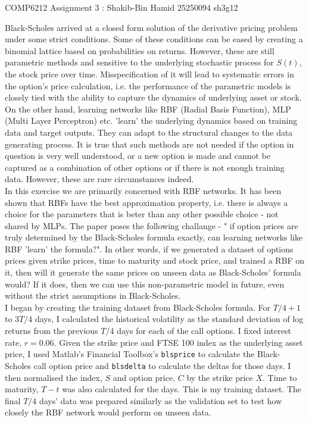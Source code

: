 \documentclass[11pt, fleqn]{article}
\begin{document}
\begin{center}

\Large{COMP6212 Assignment 3 : Shakib-Bin Hamid 25250094 sh3g12}

\end{center}

Black-Scholes arrived at a closed form solution of the derivative pricing problem under some strict conditions. Some of these conditions can be eased by creating a binomial lattice based on probabilities on returns. However, these are still parametric methods and sensitive to the underlying stochastic process for $S(t)$, the stock price over time. Misspecification of it will lead to systematic errors in the option's price calculation, i.e. the performance of the parametric models is closely tied with the ability to capture the dynamics of underlying asset or stock.\\

On the other hand, learning networks like RBF (Radial Basis Function), MLP (Multi Layer Perceptron) etc. 'learn' the underlying dynamics based on training data and target outputs. They can adapt to the structural changes to the data generating process. It is true that such methods are not needed if the option in question is very well understood, or a new option is made and cannot be captured as a combination of other options or if there is not enough training data. However, these are rare circumstances indeed.\\

In this exercise we are primarily concerned with RBF networks. It has been shown that RBFs have the best approximation property, i.e. there is always a choice for the parameters that is beter than any other possible choice - not shared by MLPs. The paper poses the following challange - " if option prices are truly determined by the Black-Scholes formula exactly, can learning networks like RBF 'learn' the formula?". In other words, if we generated a dataset of options prices given strike prices, time to maturity and stock price, and trained a RBF on it, then will it generate the same prices on unseen data as Black-Scholes' formula would? If it does, then we can use this non-parametric model in future, even without the strict assumptions in Black-Scholes.\\

I began by creating the training dataset from Black-Scholes formula. For $T/4 + 1$ to $3T/4$ days, I calculated the historical volatility as the standard deviation of log returns from the previous $T/4$ days for each of the call options. I fixed interest rate, $r = 0.06$. Given the strike price and FTSE 100 index as the underlying asset price, I used Matlab's Financial Toolbox's \texttt{blsprice} to calculate the Black-Scholes call option price and \texttt{blsdelta} to calculate the deltas for those days. I then normalised the index, $S$ and option price, $C$ by the strike price $X$. Time to maturity, $T-t$ was also calculated for the days. This is my training dataset. The final $T/4$ days' data was prepared similarly as the validation set to test how closely the RBF network would perform on unseen data.\\
\end{document}

